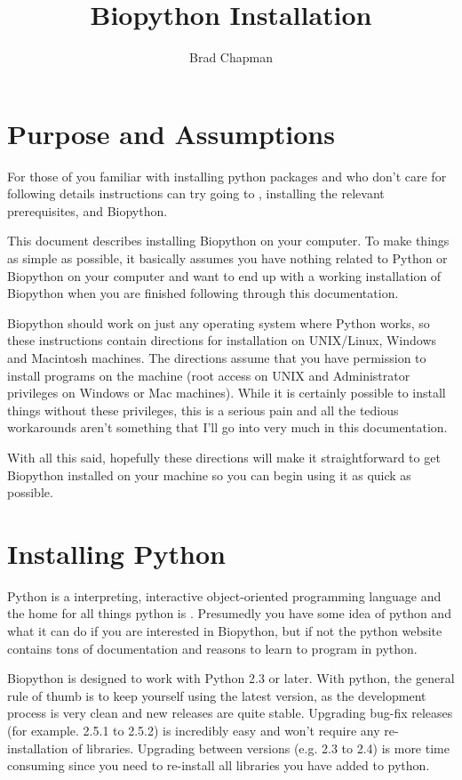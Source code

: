 \documentclass{article}
\begin{document}
\title{Biopython Installation}
\author{Brad Chapman}

\maketitle
\tableofcontents

\section{Purpose and Assumptions}

For those of you familiar with installing python packages and who don't
care for following details instructions can try going to
, installing
the relevant prerequisites, and Biopython.

This document describes installing Biopython on your computer. To make
things as simple as possible, it basically assumes you have nothing
related to Python or Biopython on your computer and want to end up with
a working installation of Biopython when you are finished following
through this documentation. 

Biopython should work on just any operating system where Python works,
so these instructions contain directions for installation on UNIX/Linux,
Windows and Macintosh machines. The directions assume 
that you have permission to install programs on the machine
(root access on UNIX and Administrator privileges on Windows or Mac
machines). While it is certainly possible to install things without
these privileges, this is a serious pain and all the tedious workarounds
aren't something that I'll go into very much in this documentation.

With all this said, hopefully these directions will make it
straightforward to get Biopython installed on your machine so you can
begin using it as quick as possible.

\section{Installing Python}

Python is a interpreting, interactive object-oriented programming
language and the home for all things python is
. Presumedly you have some idea of
python and what it can do if you are interested in Biopython, but if not
the python website contains tons of documentation and reasons to learn
to program in python.

Biopython is designed to work with Python 2.3 or later. With python, the
general rule of thumb is to keep yourself using the latest version, as
the development process is very clean and new releases are quite stable.
Upgrading bug-fix releases (for example. 2.5.1 to 2.5.2) 
is incredibly easy and won't require any re-installation of libraries.
Upgrading between versions (e.g. 2.3 to 2.4) is more time consuming since you
need to re-install all libraries you have added to python.
\end{document}
